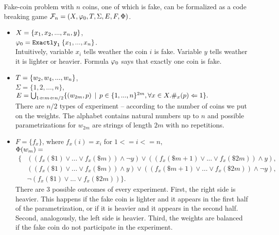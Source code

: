 \begin{example} \label{ex:form-fake-coin1}
Fake-coin problem with $n$ coins, one of which is fake, can be formalized as
a code breaking game
$\mathcal{F}_n = (X, \varphi_0, T, \Sigma, E, F, \Phi)$.

\begin{itemize}
\item
$X = \{x_1, x_2, ..., x_n, y\}$, \\
$\varphi_0 = \mathtt{Exactly}_{1}\:\{x_1, ..., x_n\}$. \\
Intuitively, variable $x_i$ tells weather the coin $i$ is fake.
Variable $y$ tells weather it is lighter or heavier.
Formula $\varphi_0$ says that exactly one coin is fake.

\item
$T = \{ w_2, w_4, ..., w_n \}$, \\
$\Sigma = \{1, 2,...,n\}$, \\
$E = \bigcup_{1<=m<=n/2} \{ (w_{2m}, p) \:\:|\:\:
  p \in \{1,...,n\}^{2m}, \forall x\in X. \#_x(p)<=1 \}. $\\
There are $n/2$ types of experiment -- according to the number of coins we put on the weights.
The alphabet contains natural numbers up to $n$ and
possible parametrizations for $w_{2m}$ are strings of length $2m$ with no repetitions.

\item
$F = \{ f_x \}$, where $f_x(i) = x_i$ for $1 <= i <= n$, \\
$\Phi(w_m) = $ \vspace{-3mm}
\begin{align*}
  \big\{
& ((f_x(\$1) \vee ... \vee f_x(\$m)) \wedge \neg y) \vee ((f_x(\$m+1) \vee ... \vee f_x(\$2m)) \wedge y), \\
& ((f_x(\$1) \vee ... \vee f_x(\$m)) \wedge y) \vee ((f_x(\$m+1) \vee ... \vee f_x(\$2m)) \wedge \neg y), \\
& \neg (f_x(\$1) \vee ... \vee f_x(\$2m)) \big\}.
\end{align*}
There are 3 possible outcomes of every experiment.
First, the right side is heavier. This happens if the fake coin is lighter and it appears in the first half of the parametrization, or if it is heavier and it appears in the second half. Second, analogously, the left side is heavier.
Third, the weights are balanced if the fake coin do not participate in the experiment.
\end{itemize}
\end{example}

